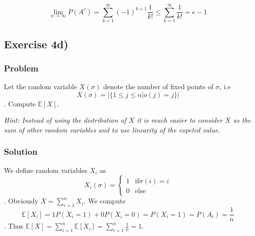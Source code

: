 \documentclass[a4paper,10pt]{article}
\begin{document}
$$
  \lim_{n \rightarrow \infty}{ P(A^c) }
   = \sum_{k=1}^{\infty}{(-1)^{k + 1}\frac{1}{k!}}
   \leq \sum_{k=1}^{\infty}{\frac{1}{k!}}
   = e - 1
$$


\subsection{Exercise 4d)}

\subsubsection{Problem}

Let the random variable $X(\sigma)$ denote the number of fixed points of $\sigma$, i.e $$
  X(\sigma) = |\{1 \leq j \leq n | o(j) = j\}|
$$. Compute $\mathbb{E}[X]$.

\noindent\textit{Hint: Instead of using the distribution of $X$ it is much easier to consider $X$ as the sum of other random variables and to use linearity of the expeted value.}

\subsubsection{Solution}

We define random variables $X_i$ as $$X_i(\sigma) = \begin{cases}
1 & \mbox{if} \sigma(i) = i\\
0 & \mbox{else}
\end{cases}$$. Obviously $X = \sum_{i = 1}^{n}{X_i}$.
We compute $$\mathbb{E}[X_i] = 1 P(X_i = 1) + 0 P(X_i = 0) = P(X_i = 1) = P(A_i) = \frac{1}{n}$$.
Thus $\mathbb{E}[X] = \sum_{i = 1}^{n}{\mathbb{E}[X_i]} = \sum_{i = 1}^{n}{\frac{1}{n}} = 1$.
\end{document}
